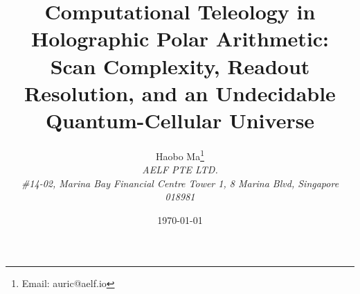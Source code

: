 \documentclass[11pt,a4paper]{article}
\title{Computational Teleology in Holographic Polar Arithmetic: \\ Scan Complexity, Readout Resolution, and an Undecidable Quantum-Cellular Universe}
\author{Haobo Ma\thanks{Email: auric@aelf.io} \\
\textit{AELF PTE LTD.} \\
\textit{\#14-02, Marina Bay Financial Centre Tower 1, 8 Marina Blvd, Singapore 018981}}
\date{\today}
\begin{document}
\maketitle














\FloatBarrier
\appendix


\FloatBarrier

\end{document}
